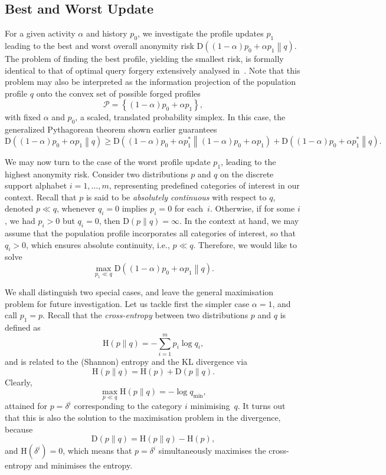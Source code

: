 \subsection{Best and Worst Update}
\label{sec:1.6}

\noindent
For a given activity $\alpha$ and history $p_0$, we investigate the profile updates $p_1$ leading to the best and worst overall anonymity risk $\text{D}\left((1-\alpha)p_0+\alpha p_1\middle\|q\right)$. The problem of finding the best profile, yielding the smallest risk, is formally identical to that of optimal query forgery extensively analysed in~\cite{Rebollo10IT}. Note that this problem may also be interpreted as the information projection of the population profile $q$ onto the convex set of possible forged profiles
$$\mathscr{P}=\left\{(1-\alpha)p_0+\alpha p_1\right\},$$
with fixed $\alpha$ and $p_0$, a scaled, translated probability simplex. In this case, the generalized Pythagorean theorem shown earlier guarantees
$$\text{D}\left((1-\alpha)p_0+\alpha p_1\middle\|q\right)\geqslant\text{D}\left((1-\alpha)p_0+\alpha p_1^*\middle\|(1-\alpha)p_0+\alpha p_1\right)+\text{D}\left((1-\alpha)p_0+\alpha p_1^*\middle\|q\right).$$

We may now turn to the case of the worst profile update $p_1$, leading to the highest anonymity risk. Consider two distributions $p$ and $q$ on the discrete support alphabet $i=1,\dots,m$, representing predefined categories of interest in our context. Recall that $p$ is said to be \emph{absolutely continuous} with respect to $q$, denoted $p\ll q$, whenever $q_i=0$ implies $p_i=0$ for each~$i$. Otherwise, if for some $i$, we had $p_i>0$ but $q_i=0$, then $\text{D}(p\|q)=\infty$. In the context at hand, we may assume that the population profile incorporates all categories of interest, so that $q_i>0$, which ensures absolute continuity, i.e., $p\ll q$. Therefore, we would like to solve
$$\max_{p_1\ll q} \text{D}\left((1-\alpha)p_0+\alpha p_1\middle\|q\right).$$

We shall distinguish two special cases, and leave the general maximisation problem for future investigation. Let us tackle first the simpler case $\alpha=1$, and call $p_1=p$. Recall that the \emph{cross\hyp entropy} between two distributions $p$ and $q$ is defined as
$$\text{H}(p\|q)=-\sum_{i=1}^m p_i\log q_i,$$
and is related to the (Shannon) entropy and the KL divergence via
$$\text{H}(p\|q)=\text{H}(p)+\text{D}(p\|q).$$
Clearly,
$$\max_{p\ll q} \text{H}(p\|q)=-\log q_\text{min},$$
attained for $p=\delta^i$ corresponding to the category $i$ minimising~$q$. It turns out that this is also the solution to the maximisation problem in the divergence, because
$$\text{D}(p\|q)=\text{H}(p\|q)-\text{H}(p),$$
and $\text{H}(\delta^i)=0$, which means that $p=\delta^i$ simultaneously maximises the cross\hyp entropy and minimises the entropy.

